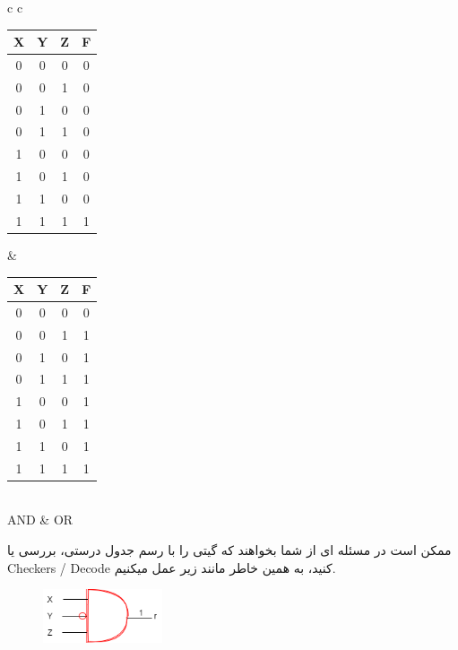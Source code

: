\documentclass[20pt, a4paper]{article}
\begin{document}
\center 
\begin{LTR}
	\begin{tabular}{ c c }
			\begin{tabular}{ c c c | c }
		X & Y & Z & F \\
		\hline
		0 & 0 & 0 &  0\\ 				
		0 & 0 & 1 &  0\\
		0 & 1 & 0 &  0\\
		0 & 1 & 1 &  0\\
		1 & 0 & 0 &  0\\
		1 & 0 & 1 &  0\\
		1 & 1 & 0 &  0\\
		1 & 1 & 1 &  1\\	
	\end{tabular}
	
	&
		\begin{tabular}{ c c c | c }
		X & Y & Z & F \\
		\hline
		0 & 0 & 0 &  0\\ 				
		0 & 0 & 1 &  1\\
		0 & 1 & 0 &  1\\
		0 & 1 & 1 &  1\\
		1 & 0 & 0 &  1\\
		1 & 0 & 1 &  1\\
		1 & 1 & 0 &  1\\
		1 & 1 & 1 &  1\\	
	\end{tabular}\\
	\hline
	AND & OR
	\end{tabular}
\end{LTR}
\hfill \break

\raggedleft
\justifying
ممکن است در مسئله ای از شما بخواهند که گیتی را با رسم جدول درستی، بررسی یا Checkers / Decode کنید، به همین خاطر مانند زیر عمل میکنیم.\\

\begin{figure}[htbp]
	\centerline{\includegraphics[width=100pt]{img/andGate.png}}
\end{figure}
\end{document}
